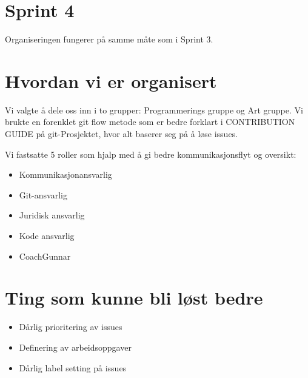 \documentclass[11pt]{article}
\begin{document}
\section*{Sprint 4}
Organiseringen fungerer på samme måte som i Sprint 3. 

\section*{Hvordan vi er organisert}

Vi valgte å dele oss inn i to grupper: Programmerings gruppe og Art gruppe.
Vi brukte en forenklet git flow metode som er bedre forklart i CONTRIBUTION
GUIDE på git-Prosjektet, hvor alt baserer seg på å løse issues.

\vspace{1em}

\noindent Vi fastsatte 5 roller som hjalp med å gi bedre kommunikasjonsflyt og
oversikt:
\begin{itemize}
\item Kommunikasjonansvarlig
\item Git-ansvarlig
\item Juridisk ansvarlig
\item Kode ansvarlig
\item CoachGunnar
\end{itemize}

\section*{Ting som kunne bli løst bedre}
\begin{itemize}
\item Dårlig prioritering av issues
\item Definering av arbeidsoppgaver
\item Dårlig label setting på issues
\end{itemize}

\vspace{1em}
\end{document}
